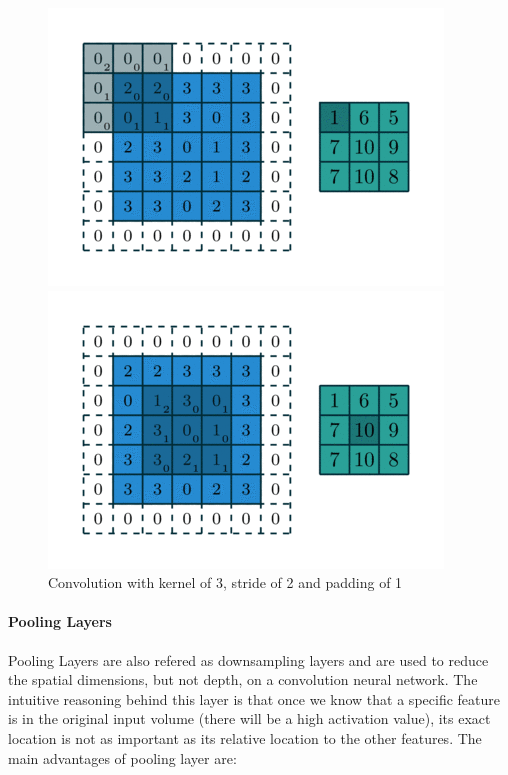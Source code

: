 \documentclass{report}
\begin{document}
\begin{figure}[h]
  \centering
  \begin{minipage}[b]{0.4\textwidth}
    \includegraphics[width=\textwidth]{conv_1}
  \end{minipage}
  \hfill
  \begin{minipage}[b]{0.4\textwidth}
    \includegraphics[width=\textwidth]{conv_2}
  \end{minipage}
  \caption{Convolution with kernel of 3, stride of 2 and padding of 1}
  \label{fig:conv_example}
\end{figure}
\paragraph{Pooling Layers}
Pooling Layers are also refered as downsampling layers and are used to reduce the spatial dimensions, but not depth, on a convolution neural network.
The intuitive reasoning behind this layer is that once we know that a specific feature is in the original input volume (there will be a high activation value),
its exact location is not as important as its relative location to the other features. The main advantages of pooling layer are:
\end{document}
